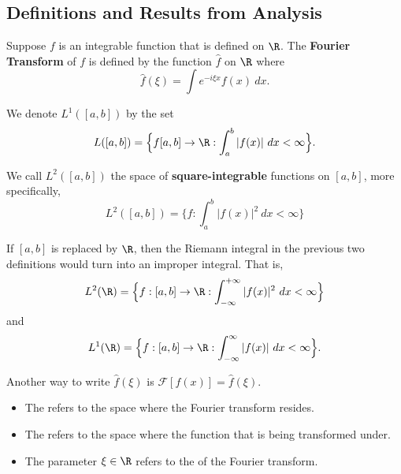 \subsection{Definitions and Results from Analysis}

\begin{definition}\label{Fourier Transform}
    Suppose \( f  \) is an integrable function that is defined on \( \R \). The \textbf{Fourier Transform} of \( f \) is defined by the function \( \hat{f} \) on \( \R \) where
    \[  \hat{f}(\xi) = \int e^{- i \xi x } f(x)  \ dx. \]
\end{definition}

\begin{definition}[\( L^1 \) space]\label{L1 Space}
    We denote \( L^{1}([a,b]) \) by the set
    \[ L([a,b]) =  \Big\{ f[a,b] \to \R : \int_{ a }^{ b } | f(x) |  \ dx < \infty  \Big\}.  \]
\end{definition}

\begin{definition}\label{L2 Space}
    We call \( L^{2}([a,b]) \) the space of \textbf{square-integrable} functions on \( [a,b] \), more specifically, 
    \[  L^{2}([a,b]) = \Big\{ f : \int_{ a }^{ b }  | f(x) |^{2} \ dx < \infty  \Big\} \]
\end{definition}

\begin{remark}
    If \( [a,b] \) is replaced by \( \R  \), then the Riemann integral in the previous two definitions would turn into an improper integral. That is,
    \[   L^{2}(\R)  =  \Big\{ f:[a,b] \to \R : \int_{ - \infty  }^{ + \infty  }  | f(x) |^{2}  \ dx < \infty  \Big\}  \]
    and
    \[  L^{1}(\R) = \Big\{ f:[a,b] \to \R : \int_{ - \infty   }^{  \infty  }  | f(x) |  \ dx < \infty \Big\}.  \]
\end{remark}

\begin{remark}
    Another way to write \( \hat{f}(\xi) \) is \( \mathcal{F} [f(x)] = \hat{f}(\xi) \).
\end{remark}

\begin{remark}
    \begin{itemize}
        \item The \label{Frequency Domain} refers to the space where the Fourier transform resides.
        \item The \label{Spatial Domain} refers to the space where the function that is being transformed under.
        \item The parameter \( \xi \in \R  \) refers to the \label{frequency variable} of the Fourier transform.
    \end{itemize}
\end{remark}

